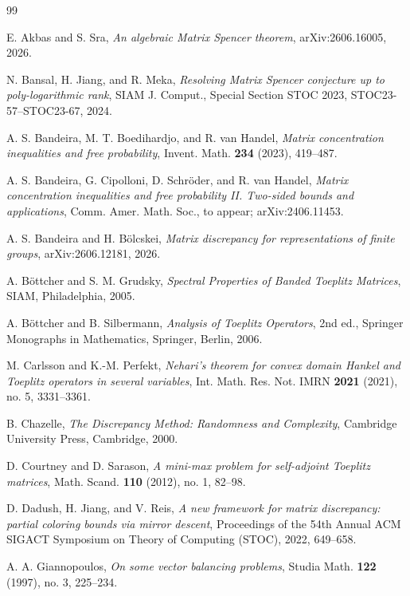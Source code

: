 \begin{thebibliography}{99}

E. Akbas and S. Sra,
\emph{An algebraic Matrix Spencer theorem},
arXiv:2606.16005, 2026.

N. Bansal, H. Jiang, and R. Meka,
\emph{Resolving Matrix Spencer conjecture up to poly-logarithmic rank},
SIAM J. Comput., Special Section STOC 2023, STOC23-57--STOC23-67, 2024.

A. S. Bandeira, M. T. Boedihardjo, and R. van Handel,
\emph{Matrix concentration inequalities and free probability},
Invent. Math. \textbf{234} (2023), 419--487.

A. S. Bandeira, G. Cipolloni, D. Schr{\"o}der, and R. van Handel,
\emph{Matrix concentration inequalities and free probability II. Two-sided bounds and applications},
Comm. Amer. Math. Soc., to appear; arXiv:2406.11453.

A. S. Bandeira and H. B{\"o}lcskei,
\emph{Matrix discrepancy for representations of finite groups},
arXiv:2606.12181, 2026.

A. B{\"o}ttcher and S. M. Grudsky,
\emph{Spectral Properties of Banded Toeplitz Matrices},
SIAM, Philadelphia, 2005.

A. B{\"o}ttcher and B. Silbermann,
\emph{Analysis of Toeplitz Operators}, 2nd ed.,
Springer Monographs in Mathematics, Springer, Berlin, 2006.

M. Carlsson and K.-M. Perfekt,
\emph{Nehari's theorem for convex domain Hankel and Toeplitz operators in several variables},
Int. Math. Res. Not. IMRN \textbf{2021} (2021), no. 5, 3331--3361.

B. Chazelle,
\emph{The Discrepancy Method: Randomness and Complexity},
Cambridge University Press, Cambridge, 2000.

D. Courtney and D. Sarason,
\emph{A mini-max problem for self-adjoint Toeplitz matrices},
Math. Scand. \textbf{110} (2012), no. 1, 82--98.

D. Dadush, H. Jiang, and V. Reis,
\emph{A new framework for matrix discrepancy: partial coloring bounds via mirror descent},
Proceedings of the 54th Annual ACM SIGACT Symposium on Theory of Computing (STOC), 2022,
649--658.

A. A. Giannopoulos,
\emph{On some vector balancing problems},
Studia Math. \textbf{122} (1997), no. 3, 225--234.


\end{thebibliography}
